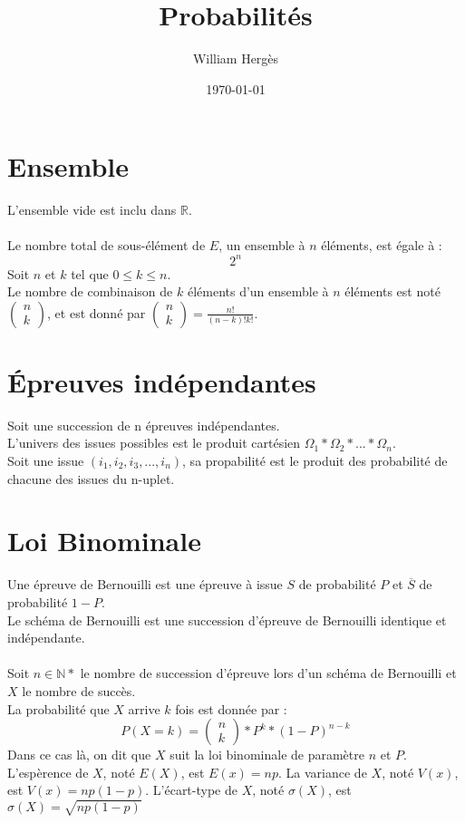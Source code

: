 \documentclass{article}
\title{Probabilités}
\author{William Hergès}
\date{\today}
\begin{document}
	\maketitle

	\section{Ensemble}

	L'ensemble vide est inclu dans $\mathbb{R}$. \\
	\\
	Le nombre total de sous-élément de $E$, un ensemble à $n$ éléments, est égale à :
	\[ 2^n\]
	Soit $n$ et $k$ tel que $0 \leqslant k \leqslant n$. \\
	Le nombre de combinaison de $k$ éléments d'un ensemble à $n$ éléments est noté $ 
		\begin{pmatrix}
                	n \\
                        k
		\end{pmatrix}
	$, et est donné par $
		\begin{pmatrix}
                	n \\
                        k
		\end{pmatrix} = \frac{n!}{(n-k)!k!}
	$.

	\section{Épreuves indépendantes}

	Soit une succession de n épreuves indépendantes. \\
	L'univers des issues possibles est le produit cartésien $\Omega_1 * \Omega_2 * ... * \Omega_n$. \\
	Soit une issue $(i_1,i_2,i_3,...,i_n)$, sa propabilité est le produit des probabilité de chacune des issues du n-uplet.

	\section{Loi Binominale}

	Une épreuve de Bernouilli est une épreuve à issue $S$ de probabilité $P$ et $\overline{S}$ de probabilité $1-P$. \\
	Le schéma de Bernouilli est une succession d'épreuve de Bernouilli identique et indépendante. \\
	\\
	Soit $n\in\mathbb{N*}$ le nombre de succession d'épreuve lors d'un schéma de Bernouilli et $X$ le nombre de succès. \\
	La probabilité que $X$ arrive $k$ fois est donnée par :
	\[ P(X = k) = \begin{pmatrix}n \\ k\end{pmatrix}*P^k*(1-P)^{n-k} \]
	Dans ce cas là, on dit que $X$ suit la loi binominale de paramètre $n$ et $P$. \\
	L'espèrence de $X$, noté $E(X)$, est $E(x) = np$. La variance de $X$, noté $V(x)$, est $V(x) = np(1-p)$. L'écart-type de $X$, noté $\sigma(X)$, est $\sigma(X) = \sqrt{np(1-p)}$
\end{document}
